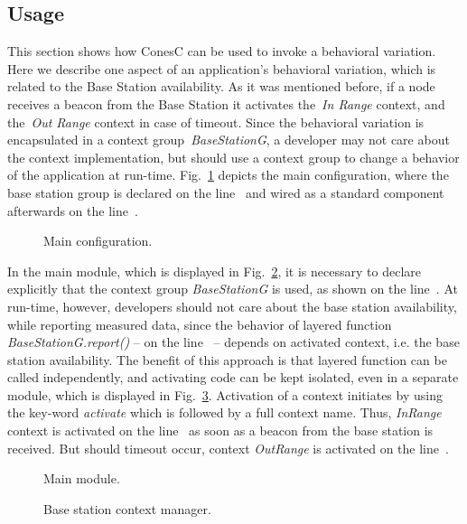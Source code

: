 \subsection{Usage}

This section shows how ConesC can be used to invoke a behavioral
variation. Here we describe one aspect of an application's behavioral variation,
which is related to the Base Station availability. As it was mentioned before,
if a node receives a beacon from the Base Station it activates the~\emph{In Range}
context, and the~\emph{Out Range} context in case of timeout.
Since the behavioral variation is encapsulated in a context group~\emph{BaseStationG},
a developer may not care about the context implementation, but should use a context group
to change a behavior of the application at run-time. Fig.~\ref{fig:mc} depicts the main
configuration, where the base station group is declared on the line~ and wired
as a standard component afterwards on the line~.


\begin{figure}[!h]
\TheSbox
\caption{Main configuration.}
\label{fig:mc}
\end{figure}

In the main module, which is displayed in Fig.~\ref{fig:mm}, it is necessary to declare
explicitly that the context group \emph{BaseStationG} is used, as shown on the line~.
At run-time, however, developers should not care about the base station availability, while
reporting measured data, since the behavior of layered function
\emph{BaseStationG.report()} -- on the line~ -- depends on activated
context, i.e. the base station availability. The benefit of
this approach is that layered function can be called independently, and activating code
can be kept isolated, even in a separate module, which is displayed in Fig.~\ref{fig:bscm}.
Activation of a context initiates by using the key-word
\emph{activate} which is followed by a full context name. Thus,
\emph{InRange} context is activated on the line~ as soon as a
beacon from the base station is received. But should timeout occur, context
\emph{OutRange} is activated on the line~.


\begin{figure}[!h]
\TheSbox
\caption{Main module.}
\label{fig:mm}
\end{figure}


\begin{figure}[!h]
\TheSbox
\caption{Base station context manager.}
\label{fig:bscm}
\end{figure}

